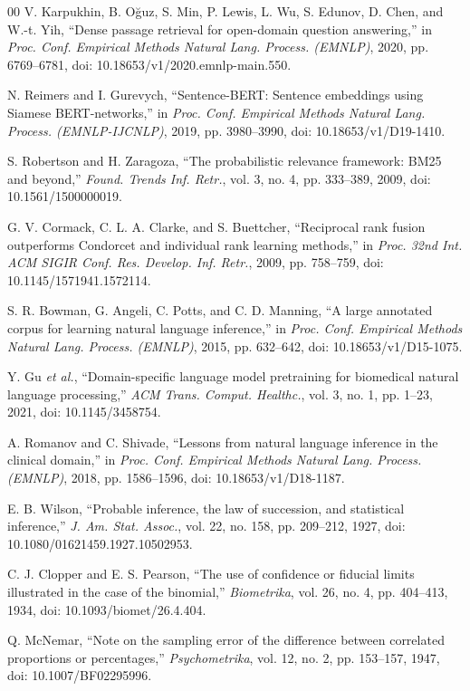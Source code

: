 \documentclass[conference]{IEEEtran}
\begin{document}
\begin{thebibliography}{00}
V. Karpukhin, B. O\u{g}uz, S. Min, P. Lewis, L. Wu, S. Edunov, D. Chen, and W.-t. Yih, ``Dense passage retrieval for
open-domain question answering,'' in \emph{Proc. Conf. Empirical Methods Natural Lang. Process. (EMNLP)}, 2020,
pp. 6769--6781, doi: 10.18653/v1/2020.emnlp-main.550.

N. Reimers and I. Gurevych, ``Sentence-BERT: Sentence embeddings using Siamese BERT-networks,'' in \emph{Proc. Conf.
Empirical Methods Natural Lang. Process. (EMNLP-IJCNLP)}, 2019, pp. 3980--3990, doi: 10.18653/v1/D19-1410.

S. Robertson and H. Zaragoza, ``The probabilistic relevance framework: BM25 and beyond,'' \emph{Found. Trends Inf.
Retr.}, vol. 3, no. 4, pp. 333--389, 2009, doi: 10.1561/1500000019.

G. V. Cormack, C. L. A. Clarke, and S. Buettcher, ``Reciprocal rank fusion outperforms Condorcet and individual rank
learning methods,'' in \emph{Proc. 32nd Int. ACM SIGIR Conf. Res. Develop. Inf. Retr.}, 2009, pp. 758--759,
doi: 10.1145/1571941.1572114.

S. R. Bowman, G. Angeli, C. Potts, and C. D. Manning, ``A large annotated corpus for learning natural language
inference,'' in \emph{Proc. Conf. Empirical Methods Natural Lang. Process. (EMNLP)}, 2015, pp. 632--642,
doi: 10.18653/v1/D15-1075.

Y. Gu \emph{et al.}, ``Domain-specific language model pretraining for biomedical natural language processing,''
\emph{ACM Trans. Comput. Healthc.}, vol. 3, no. 1, pp. 1--23, 2021, doi: 10.1145/3458754.

A. Romanov and C. Shivade, ``Lessons from natural language inference in the clinical domain,'' in \emph{Proc. Conf.
Empirical Methods Natural Lang. Process. (EMNLP)}, 2018, pp. 1586--1596, doi: 10.18653/v1/D18-1187.

E. B. Wilson, ``Probable inference, the law of succession, and statistical inference,'' \emph{J. Am. Stat. Assoc.},
vol. 22, no. 158, pp. 209--212, 1927, doi: 10.1080/01621459.1927.10502953.

C. J. Clopper and E. S. Pearson, ``The use of confidence or fiducial limits illustrated in the case of the binomial,''
\emph{Biometrika}, vol. 26, no. 4, pp. 404--413, 1934, doi: 10.1093/biomet/26.4.404.

Q. McNemar, ``Note on the sampling error of the difference between correlated proportions or percentages,''
\emph{Psychometrika}, vol. 12, no. 2, pp. 153--157, 1947, doi: 10.1007/BF02295996.

\end{thebibliography}
\end{document}
